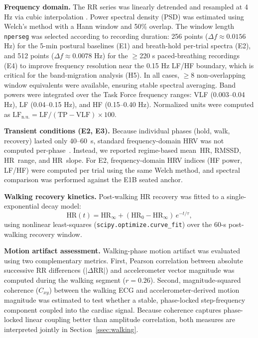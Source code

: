 \documentclass[conference]{IEEEtran}
\begin{document}
\textbf{Frequency domain.} The RR series was linearly detrended and
resampled at 4 Hz via cubic interpolation \cite{taskforce1996}. Power
spectral density (PSD) was estimated using Welch's method with a Hann
window and 50\% overlap. The window length \texttt{nperseg} was selected
according to recording duration: 256 points ($\Delta f \approx 0.0156$
Hz) for the 5-min postural baselines (E1) and breath-hold per-trial
spectra (E2), and 512 points ($\Delta f \approx 0.0078$ Hz) for the
$\geq$220 s paced-breathing recordings (E4) to improve frequency
resolution near the 0.15 Hz LF/HF boundary, which is critical for the
band-migration analysis (H5). In all cases, $\geq$8 non-overlapping
window equivalents were available, ensuring stable spectral averaging.
Band powers were integrated over the Task Force frequency ranges: VLF
(0.003--0.04 Hz), LF (0.04--0.15 Hz), and HF (0.15--0.40 Hz). Normalized
units were computed as $\text{LF}_{\text{n.u.}} = \text{LF}/(\text{TP}
- \text{VLF}) \times 100$.

\textbf{Transient conditions (E2, E3).}
Because individual phases (hold, walk, recovery) lasted only
40--60~s, standard frequency-domain HRV was not computed
per-phase~\cite{taskforce1996}.
Instead, we reported regime-based mean~HR, RMSSD, HR~range, and
HR~slope.
For E2, frequency-domain HRV indices (HF power, LF/HF) were
computed per trial using the same Welch method, and spectral
comparison was performed against the E1B seated anchor.

\textbf{Walking recovery kinetics.}
Post-walking HR recovery was fitted to a single-exponential decay
model:
\begin{equation}
  \text{HR}(t) = \text{HR}_{\infty}
  + (\text{HR}_{0} - \text{HR}_{\infty})\,
    e^{-t/\tau},
\label{eq:recovery}
\end{equation}
using nonlinear least-squares (\texttt{scipy.optimize.curve\_fit})
over the 60-s post-walking recovery window.

\textbf{Motion artifact assessment.}
Walking-phase motion artifact was evaluated using two
complementary metrics.
First, Pearson correlation between absolute successive RR
differences ($|\Delta\text{RR}|$) and accelerometer vector magnitude
was computed during the walking segment ($r = 0.26$).
Second, magnitude-squared coherence ($C_{xy}$) between the walking
ECG and accelerometer-derived motion magnitude was estimated to test
whether a stable, phase-locked step-frequency component coupled into
the cardiac signal.
Because coherence captures phase-locked linear coupling better than
amplitude correlation, both measures are interpreted jointly in
Section~\ref{ssec:walking}.
\end{document}

